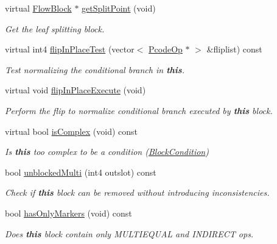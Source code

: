 \begin{DoxyCompactItemize}
virtual \mbox{\hyperlink{class_flow_block}{Flow\+Block}} $\ast$ \mbox{\hyperlink{class_block_basic_a22d7b010455f00b1bb1ff5efb3d00550}{get\+Split\+Point}} (void)
\begin{DoxyCompactList}\small\item\em Get the leaf splitting block. \end{DoxyCompactList}\item 
virtual int4 \mbox{\hyperlink{class_block_basic_a7f864c14ab60a19ffb492b86f98f29c7}{flip\+In\+Place\+Test}} (vector$<$ \mbox{\hyperlink{class_pcode_op}{Pcode\+Op}} $\ast$ $>$ \&fliplist) const
\begin{DoxyCompactList}\small\item\em Test normalizing the conditional branch in {\bfseries{this}}. \end{DoxyCompactList}\item 
virtual void \mbox{\hyperlink{class_block_basic_a2949ef4a8d42f16c696fd24ba2ecb58c}{flip\+In\+Place\+Execute}} (void)
\begin{DoxyCompactList}\small\item\em Perform the flip to normalize conditional branch executed by {\bfseries{this}} block. \end{DoxyCompactList}\item 
virtual bool \mbox{\hyperlink{class_block_basic_ad9dc5c967ac739b462614c1b75f93c22}{is\+Complex}} (void) const
\begin{DoxyCompactList}\small\item\em Is {\bfseries{this}} too complex to be a condition (\mbox{\hyperlink{class_block_condition}{Block\+Condition}}) \end{DoxyCompactList}\item 
bool \mbox{\hyperlink{class_block_basic_a71442a96a2278c3b88c8027f4b1444c9}{unblocked\+Multi}} (int4 outslot) const
\begin{DoxyCompactList}\small\item\em Check if {\bfseries{this}} block can be removed without introducing inconsistencies. \end{DoxyCompactList}\item 
bool \mbox{\hyperlink{class_block_basic_a889777af9024df726d21540187277edd}{has\+Only\+Markers}} (void) const
\begin{DoxyCompactList}\small\item\em Does {\bfseries{this}} block contain only M\+U\+L\+T\+I\+E\+Q\+U\+AL and I\+N\+D\+I\+R\+E\+CT ops. \end{DoxyCompactList}\item 

\end{DoxyCompactItemize}
